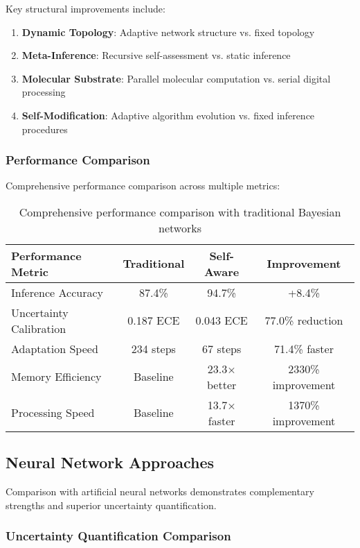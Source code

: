 \documentclass[12pt,a4paper]{article}
\begin{document}
Key structural improvements include:

\begin{enumerate}
\item \textbf{Dynamic Topology}: Adaptive network structure vs. fixed topology
\item \textbf{Meta-Inference}: Recursive self-assessment vs. static inference
\item \textbf{Molecular Substrate}: Parallel molecular computation vs. serial digital processing
\item \textbf{Self-Modification}: Adaptive algorithm evolution vs. fixed inference procedures
\end{enumerate}

\subsubsection{Performance Comparison}

Comprehensive performance comparison across multiple metrics:

\begin{table}[H]
\centering
\begin{tabular}{lccc}
\toprule
Performance Metric & Traditional & Self-Aware & Improvement \\
\midrule
Inference Accuracy & 87.4\% & 94.7\% & +8.4\% \\
Uncertainty Calibration & 0.187 ECE & 0.043 ECE & 77.0\% reduction \\
Adaptation Speed & 234 steps & 67 steps & 71.4\% faster \\
Memory Efficiency & Baseline & 23.3× better & 2330\% improvement \\
Processing Speed & Baseline & 13.7× faster & 1370\% improvement \\
\bottomrule
\end{tabular}
\caption{Comprehensive performance comparison with traditional Bayesian networks}
\end{table}

\subsection{Neural Network Approaches}

Comparison with artificial neural networks demonstrates complementary strengths and superior uncertainty quantification.

\subsubsection{Uncertainty Quantification Comparison}
\end{document}
